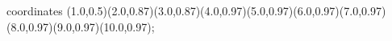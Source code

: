 					coordinates { (1.0,0.5)(2.0,0.87)(3.0,0.87)(4.0,0.97)(5.0,0.97)(6.0,0.97)(7.0,0.97)(8.0,0.97)(9.0,0.97)(10.0,0.97)};